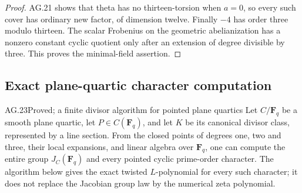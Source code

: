 \begin{proof}
AG.21 shows that theta has no thirteen-torsion when
$a=0$, so every such cover has ordinary new factor,
of dimension twelve. Finally $-4$ has order three
modulo thirteen. The scalar Frobenius on the geometric
abelianization has a nonzero constant cyclic quotient
only after an extension of degree divisible by three.
This proves the minimal-field assertion.
\end{proof}

\subsection{Exact plane-quartic character computation}

\begin{claim}{AG.23}{Proved; a finite divisor algorithm for pointed plane quartics}
Let $C/\mathbf F_q$ be a smooth plane quartic, let
$P\in C(\mathbf F_q)$, and let $K$ be its canonical
divisor class, represented by a line section. From the closed
points of degrees one, two and three, their local expansions,
and linear algebra over $\mathbf F_q$, one can compute the
entire group $J_C(\mathbf F_q)$ and every pointed cyclic
prime-order character. The algorithm below gives the exact
twisted $L$-polynomial for every such character; it does not
replace the Jacobian group law by the numerical zeta polynomial.
\end{claim}
